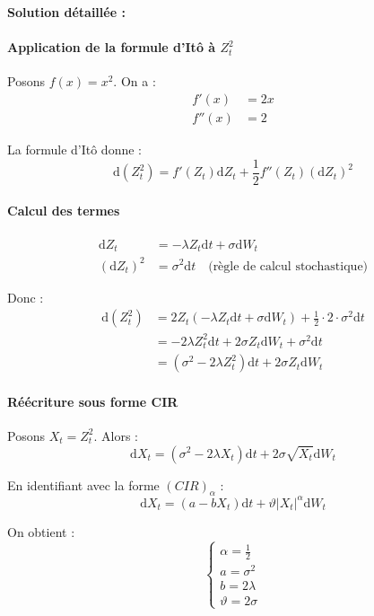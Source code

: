 \documentclass[12pt,a4paper]{article}
\theoremstyle{definition}
\theoremstyle{remark}
\newcommand{\dd}{\mathrm{d}}
\begin{document}
\textbf{Solution détaillée :}

\paragraph{Application de la formule d'Itô à $Z_t^2$}

Posons $f(x) = x^2$. On a :
\begin{align*}
f'(x) &= 2x \\
f''(x) &= 2
\end{align*}

La formule d'Itô donne :
\[
\dd(Z_t^2) = f'(Z_t)\dd Z_t + \frac{1}{2}f''(Z_t)(\dd Z_t)^2
\]

\paragraph{Calcul des termes}

\begin{align*}
\dd Z_t &= -\lambda Z_t \dd t + \sigma \dd W_t \\
(\dd Z_t)^2 &= \sigma^2 \dd t \quad \text{(règle de calcul stochastique)}
\end{align*}

Donc :
\begin{align*}
\dd(Z_t^2) &= 2Z_t(-\lambda Z_t \dd t + \sigma \dd W_t) + \frac{1}{2} \cdot 2 \cdot \sigma^2 \dd t \\
&= -2\lambda Z_t^2 \dd t + 2\sigma Z_t \dd W_t + \sigma^2 \dd t \\
&= (\sigma^2 - 2\lambda Z_t^2)\dd t + 2\sigma Z_t \dd W_t
\end{align*}

\paragraph{Réécriture sous forme CIR}

Posons $X_t = Z_t^2$. Alors :
\[
\dd X_t = (\sigma^2 - 2\lambda X_t)\dd t + 2\sigma \sqrt{X_t} \dd W_t
\]

En identifiant avec la forme $(CIR)_\alpha$ :
\[
\dd X_t = (a - bX_t)\dd t + \vartheta |X_t|^\alpha \dd W_t
\]

On obtient :
\begin{equation}
\boxed{
\begin{cases}
\alpha = \frac{1}{2} \\
a = \sigma^2 \\
b = 2\lambda \\
\vartheta = 2\sigma
\end{cases}
}
\end{equation}
\end{document}
